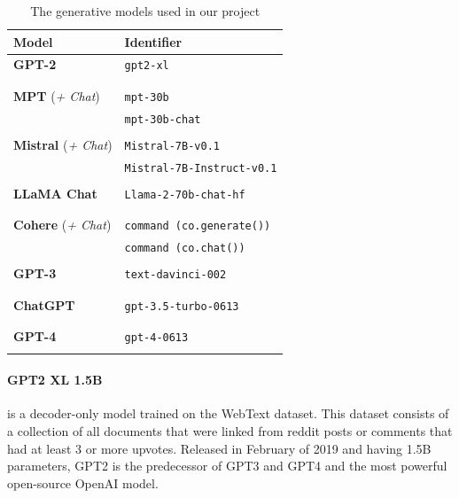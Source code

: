 \documentclass[11pt]{article}
\begin{document}
\begin{table}
\centering 
\small
\begin{tabular}{l|l} 
\toprule
\textbf{Model}&\textbf{Identifier}\\
\midrule
\textbf{GPT-2}&\texttt{gpt2-xl}\\
\cite{radford2019language}&\\
&\\
\textbf{MPT} (\textit{+ Chat}) &\texttt{mpt-30b}\\
\cite{MosaicML2023Introducing}&\texttt{mpt-30b-chat}\\
&\\
\textbf{Mistral} (\textit{+ Chat})&\texttt{Mistral-7B-v0.1}\\
\cite{jiang2023mistral}&\texttt{Mistral-7B-Instruct-v0.1}\\
&\\
\textbf{LLaMA Chat}&\texttt{Llama-2-70b-chat-hf}\\
\cite{touvron2023llama}&\\
&\\
\textbf{Cohere} (\textit{+ Chat})&\texttt{command (co.generate())}\\
\cite{Cohere2024}&\texttt{command (co.chat())}\\
&\\
\textbf{GPT-3}&\texttt{text-davinci-002}\\
\cite{ouyang2022training}&\\
&\\
\textbf{ChatGPT}&\texttt{gpt-3.5-turbo-0613}\\
\cite{chatgpt-etal-2022}&\\
&\\
\textbf{GPT-4}&\texttt{gpt-4-0613}\\
\cite{openai2023gpt4}&\\
\bottomrule
\end{tabular}
\caption{The generative models used in our project}
\label{tab:generative_models}
\end{table}

\paragraph{GPT2 XL 1.5B}\cite{radford2019language} is a decoder-only model trained on the WebText dataset. This dataset consists of a collection of all documents that were linked from reddit posts or comments that had at least 3 or more upvotes. Released in February of 2019 and having 1.5B parameters, GPT2 is the predecessor of GPT3 and GPT4 and the most powerful open-source OpenAI model. 
\end{document}
